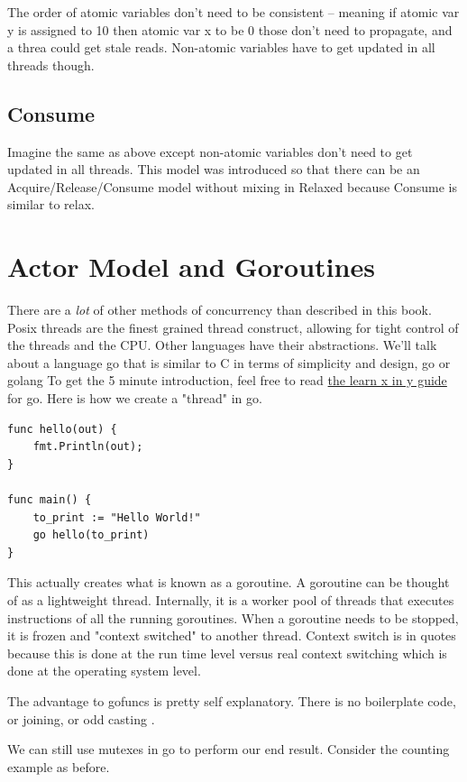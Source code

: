 The order of atomic variables don't need to be consistent -- meaning if atomic var y is assigned to 10 then atomic var x to be 0 those don't need to propagate, and a threa could get stale reads.
Non-atomic variables have to get updated in all threads though.

\subsection{Consume}

Imagine the same as above except non-atomic variables don't need to get updated in all threads.
This model was introduced so that there can be an Acquire/Release/Consume model without mixing in Relaxed because Consume is similar to relax.

\section{Actor Model and Goroutines}

There are a \textit{lot} of other methods of concurrency than described in this book.
Posix threads are the finest grained thread construct, allowing for tight control of the threads and the CPU.
Other languages have their abstractions.
We'll talk about a language go that is similar to C in terms of simplicity and design, go or golang
To get the 5 minute introduction, feel free to read \href{https://learnxinyminutes.com/docs/go/}{the learn x in y guide} for go.
Here is how we create a "thread" in go.

\begin{lstlisting}[language=golang]
func hello(out) {
    fmt.Println(out);
}

func main() {
    to_print := "Hello World!"
    go hello(to_print)
}
\end{lstlisting}

This actually creates what is known as a goroutine.
A goroutine can be thought of as a lightweight thread.
Internally, it is a worker pool of threads that executes instructions of all the running goroutines.
When a goroutine needs to be stopped, it is frozen and "context switched" to another thread.
Context switch is in quotes because this is done at the run time level versus real context switching which is done at the operating system level.

The advantage to gofuncs is pretty self explanatory.
There is no boilerplate code, or joining, or odd casting .

We can still use mutexes in go to perform our end result.
Consider the counting example as before.

